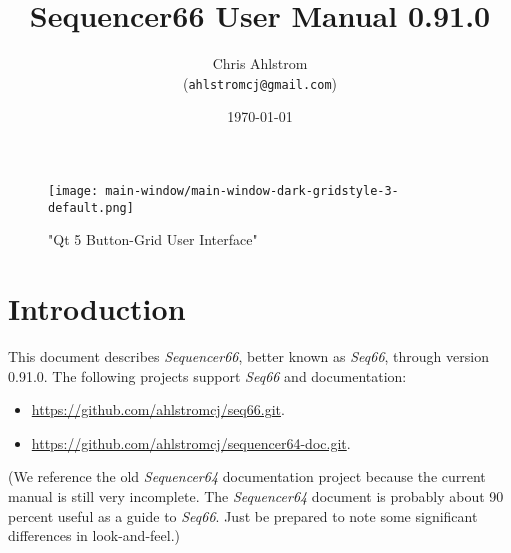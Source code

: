 \documentclass[
 11pt,
 twoside,
 a4paper,
 headinclude,
 footinclude,
 final                                 %
]{article}
\begin{document}
\title{Sequencer66 User Manual 0.91.0}
\author{Chris Ahlstrom \\
   (\texttt{ahlstromcj@gmail.com})}
\date{\today}
\maketitle


\begin{figure}[H]
   \centering 
   \texttt{[image: main-window/main-window-dark-gridstyle-3-default.png]}
   \caption*{"Qt 5 Button-Grid User Interface"}
\end{figure}

\clearpage                             %

\tableofcontents
\listoffigures                         %
\listoftables                          %


\setlength{\parindent}{2em}
\setlength{\parskip}{1ex plus 0.5ex minus 0.2ex}

\section{Introduction}
\label{sec:introduction}

   This document describes \textsl{Sequencer66}, better known as
   \textsl{Seq66},
   through version 0.91.0.
   The following projects support \textsl{Seq66} and documentation:

   \begin{itemize}
      \item \url{https://github.com/ahlstromcj/seq66.git}.
      \item \url{https://github.com/ahlstromcj/sequencer64-doc.git}.
   \end{itemize}

   (We reference the old \textsl{Sequencer64} documentation project because
   the current manual is still very incomplete.  The \textsl{Sequencer64}
   document is probably about 90 percent useful as a guide to \textsl{Seq66}.
   Just be prepared to note some significant differences in look-and-feel.)
\end{document}
